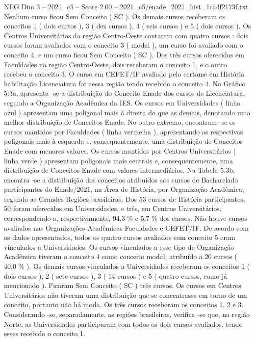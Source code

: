 \begin{textsample}{NEG Dim 3 – 2021\_c5 – Score 2.00 – 2021\_c5/enade\_2021\_hist\_1ca4f2173f.txt}
Nenhum curso ficou Sem Conceito ( SC ).
Os demais cursos receberam os conceitos 1 ( dois cursos ), 3 ( dez cursos ), 4 ( seis cursos ) e 5 ( dois cursos ).
Os Centros Universitários da região Centro-Oeste contaram com quatro cursos : dois cursos foram avaliados com o conceito 3 ( modal ), um curso foi avaliado com o conceito 4, e um curso ficou Sem Conceito ( SC ).
Dos três cursos oferecidos em Faculdades na região Centro-Oeste, dois receberam o conceito 1, e o outro recebeu o conceito 3.
O curso em CEFET/IF avaliado pelo certame em História habilitação Licenciatura foi nessa região tendo recebido o conceito 4.
No Gráfico 5.3a, apresenta -se a distribuição do Conceito Enade dos cursos de Licenciatura, segundo a Organização Acadêmica da IES.
Os cursos em Universidades ( linha azul ) apresentam uma poligonal mais à direita do que as demais, denotando uma melhor distribuição de Conceitos Enade.
No outro extremo, encontram -se os cursos mantidos por Faculdades ( linha vermelha ), apresentando as respectivas poligonais mais à esquerda e, consequentemente, uma distribuição de Conceitos Enade com menores valores.
Os cursos mantidos por Centros Universitários ( linha verde ) apresentam poligonais mais centrais e, consequentemente, uma distribuição de Conceitos Enade com valores intermediários.
Na Tabela 5.3b, encontra -se a distribuição dos conceitos atribuídos aos cursos de Bacharelado participantes do Enade/2021, na Área de História, por Organização Acadêmica, segundo as Grandes Regiões brasileiras.
Dos 53 cursos de História participantes, 50 foram oferecidos em Universidades, e três, em Centros Universitários, correspondendo a, respectivamente, 94,3 \% e 5,7 \% dos cursos.
Não houve cursos avaliados nas Organizações Acadêmicas Faculdades e CEFET/IF.
De acordo com os dados apresentados, todos os quatro cursos avaliados com conceito 5 eram vinculados a Universidades.
Os cursos vinculados a esse tipo de Organização Acadêmica tiveram o conceito 4 como conceito modal, atribuído a 20 cursos ( 40,0 \% ).
Os demais cursos vinculados a Universidades receberam os conceitos 1 ( dois cursos ), 2 ( sete cursos ), 3 ( 14 cursos ) e 5 ( quatro cursos, como já mencionado ).
Ficaram Sem Conceito ( SC ) três cursos.
Os cursos em Centros Universitários não tiveram uma distribuição que se concentrasse em torno de um conceito, portanto não há moda.
Os três cursos receberam os conceitos 1, 2 e 3.
Considerando -se, separadamente, as regiões brasileiras, verifica -se que, na região Norte, as Universidades participaram com todos os dois cursos avaliados, tendo esses recebido o conceito 1.

\end{textsample}
